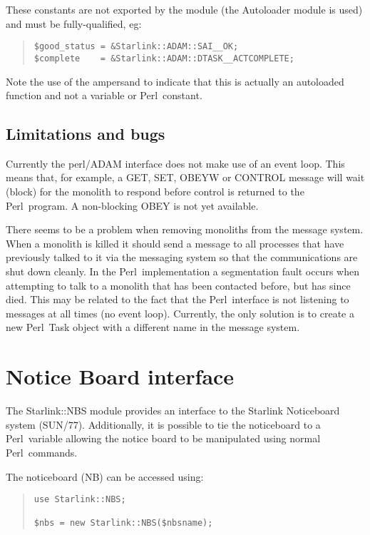 \documentclass[twoside,11pt]{article}
\newenvironment{myquote}{\begin{quote}\begin{small}}{\end{small}\end{quote}}
\newcommand{\perl}{\xref{\textsf{Perl}}{sun193}{}}
\newcommand{\xref}[3]{#1}
\renewcommand{\_}{\texttt{\symbol{95}}}
\begin{document}
These constants are not exported by the module (the Autoloader module is used) 
and must be fully-qualified, eg:

\begin{myquote}
\begin{verbatim}
$good_status = &Starlink::ADAM::SAI__OK;
$complete    = &Starlink::ADAM::DTASK__ACTCOMPLETE;
\end{verbatim}
\end{myquote}

Note the use of the ampersand to indicate that this is actually an
autoloaded function and not a variable or \perl\ constant.

\subsection{Limitations and bugs}

Currently the perl/ADAM interface does not make use of an event loop.
This means that, for example, a GET, SET, OBEYW or CONTROL message will
wait (block) for the monolith to respond before control is returned
to the \perl\ program. A non-blocking OBEY is not yet available.

There seems to be a problem when removing monoliths from the message
system. When a monolith is killed it should send a message to
all processes that have previously talked to it via the messaging
system so that the communications are shut down cleanly. In the \perl\
implementation a segmentation fault occurs when attempting to talk
to a monolith that has been contacted before, but has since died.
This may be related to the fact that the \perl\ interface is not
listening to messages at all times (no event loop). Currently, the
only solution is to create a new \perl\ Task object with a different
name in the message system.

\section{Notice Board interface}

The Starlink::NBS module provides an interface to the Starlink
Noticeboard system (\xref{SUN/77}{sun77}{}). Additionally, it is possible
to tie the noticeboard to a \perl\ variable allowing the notice board
to be manipulated using normal \perl\ commands.

The noticeboard (NB) can be accessed using:

\begin{myquote}
\begin{verbatim}
use Starlink::NBS;

$nbs = new Starlink::NBS($nbsname);
\end{verbatim}
\end{myquote}
\end{document}
